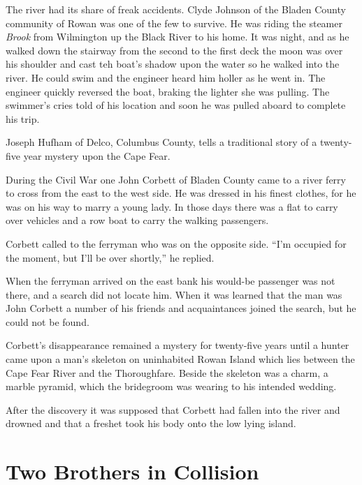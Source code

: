\documentclass[11pt, a5paper, openright]{book}
\newcommand{\steamer}[1]{\textit{#1}\index{#1,~steamer}}
\begin{document}
The river had its share of freak accidents.  Clyde
Johnson of the Bladen County community of Rowan
was one of the few to survive.  He was riding the steamer
\steamer{Brook} from Wilmington up the Black River to his home.  It
was night, and as he walked down the stairway from the second to the
first deck the moon was over his shoulder and cast teh boat's shadow
upon the water so he walked into the river.  He could swim and the
engineer heard him holler as he went in.  The engineer quickly
reversed the boat, braking the lighter she was pulling.  The swimmer's
cries told of his location and soon he was pulled aboard to complete
his trip.\par

Joseph Hufham of Delco, Columbus County, tells a
traditional story of a twenty-five year mystery upon the Cape
Fear.\par

During the Civil War one John Corbett of Bladen
County came to a river ferry to cross from the east to the west side.
He was dressed in his finest clothes, for he was on his way to marry a
young lady.  In those days there was a flat to carry over vehicles and
a row boat to carry the walking passengers.\par

Corbett called to the ferryman who was on the opposite side.  ``I'm
occupied for the moment, but I'll be over shortly,'' he replied.\par

When the ferryman arrived on the east bank his would-be passenger was
not there, and a search did not locate him.  When it was learned that
the man was John Corbett a number of his friends and acquaintances
joined the search, but he could not be found.\par

Corbett's disappearance remained a mystery for twenty-five years until
a hunter came upon a man's skeleton on uninhabited Rowan Island which
lies between the Cape Fear River and the Thoroughfare.  Beside the
skeleton was a charm, a marble pyramid, which the bridegroom was
wearing to his intended wedding.\par

After the discovery it was supposed that Corbett had fallen into the river and drowned and that a freshet took his body onto the low lying island.\par

\section{Two Brothers in Collision}
\end{document}
